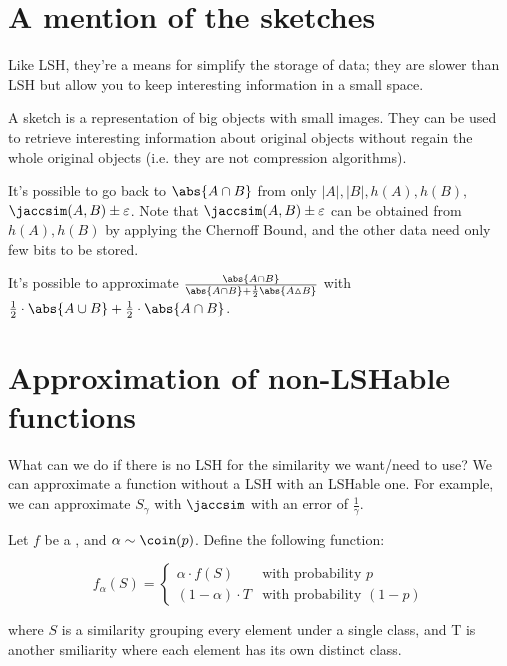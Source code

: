\section{A mention of the sketches}

Like LSH, they're a means for simplify the storage of data; they are slower than LSH but allow you to keep interesting information in a small space.

 A sketch is a representation of big objects with small images. They can be used to retrieve interesting information about original objects without regain the whole original objects (i.e. they are not compression algorithms).

\ex It's possible to go back to $\abs{A \cap B}$ from only $|A|, |B|, h(A), h(B),$ $\jaccsim(A,B)\pm\varepsilon$. Note that $\jaccsim(A,B)\pm\varepsilon$ can be obtained from $h(A), h(B)$ by applying the Chernoff Bound, and the other data need only few bits to be stored.

\ex It's possible to approximate $\frac{\abs{A \cap B}}{\abs{A \cap B} + \frac{1}{2}\abs{A \vartriangle B}}$ with
	$\frac{1}{2} \cdot \abs{A \cup B} + \frac{1}{2} \cdot \abs{A \cap B}$.

	
	
	
	
\section{Approximation of non-LSHable functions}

What can we do if there is no LSH for the similarity we want/need to use? We can approximate a function without a LSH with an LSHable one. For example, we can approximate $S_\gamma$ with $\jaccsim$ with an error of $\frac{1}{\gamma}$.

\begin{thm}
	Let $f$ be a \pgf, and $\alpha \sim \coin(p)$. Define the following function:

	\[
		f_\alpha(S) = \begin{cases}
			\alpha \cdot f(S)		& \text{with probability $p$} \\
			(1 - \alpha) \cdot T	& \text{with probability $(1 - p)$}
		\end{cases}
	\]

	where $S$ is a similarity grouping every element under a single class, and T is another smiliarity where each element has its own distinct class.
\end{thm}

